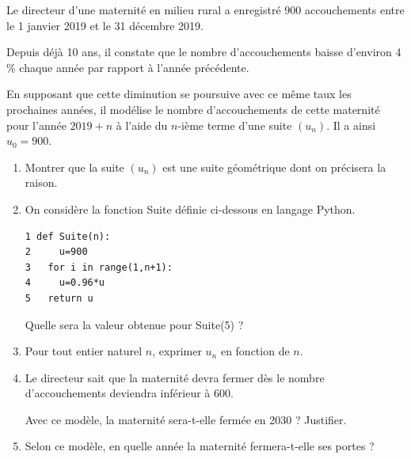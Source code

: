 \medskip

Le directeur d'une maternité en milieu rural a enregistré $900$ accouchements entre le 1
janvier 2019 et le 31 décembre 2019.

Depuis déjà 10 ans, il constate que le nombre d'accouchements baisse d'environ 4\,\% chaque
année par rapport à l'année précédente.

En supposant que cette diminution se poursuive avec ce même taux les prochaines années, il
modélise le nombre d'accouchements de cette maternité pour l'année $2019 + n$ à l'aide du
$n$-ième terme d'une suite $\left(u_n\right)$. Il a ainsi $u_0 = 900$.

\medskip

\begin{enumerate}
\item Montrer que la suite $\left(u_n\right)$ est une suite géométrique dont on précisera la raison.
\item On considère la fonction Suite définie ci-dessous en langage Python.
\begin{lstlisting}[style=python]
1 def Suite(n):
2 	  u=900
3   for i in range(1,n+1):
4 	  u=0.96*u
5   return u 
\end{lstlisting}

Quelle sera la valeur obtenue pour Suite(5) ?
\item Pour tout entier naturel $n$, exprimer $u_n$ en fonction de $n$.
\item Le directeur sait que la maternité devra fermer dès le nombre d'accouchements
deviendra inférieur à 600.

Avec ce modèle, la maternité sera-t-elle fermée en 2030 ? Justifier.
\item Selon ce modèle, en quelle année la maternité fermera-t-elle ses portes ?
\end{enumerate}

\vspace{0,5cm}
